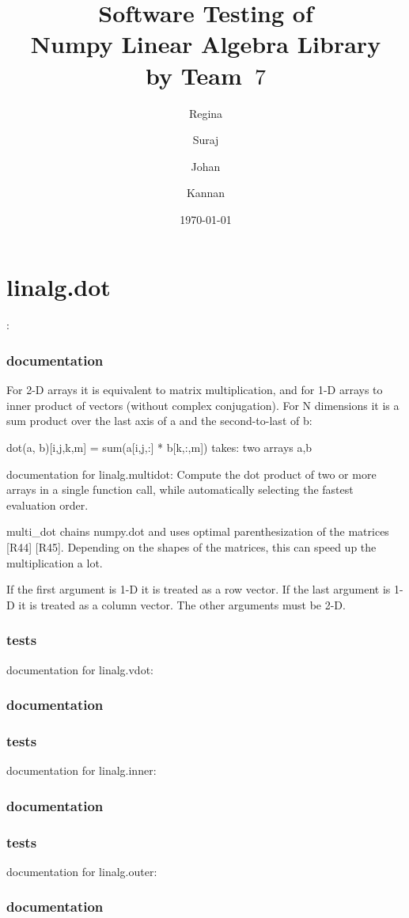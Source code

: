 \documentclass[a4paper,11pt]{article}
\title{\textbf{Software Testing of \\ Numpy Linear Algebra Library\\
        by Team~$7$                                   %
}
}
\author{Regina \and Suraj \and Johan \and Kannan}  %
\date{\today}
\begin{document}
\section{linalg.dot}:
\subsubsection{documentation}
For 2-D arrays it is equivalent to matrix multiplication, and for 1-D arrays to inner product of vectors (without complex conjugation). For N dimensions it is a sum product over the last axis of a and the second-to-last of b:

    dot(a, b)[i,j,k,m] = sum(a[i,j,:] * b[k,:,m])
    takes: two arrays a,b
    
documentation for linalg.multidot:
Compute the dot product of two or more arrays in a single function call, while automatically selecting the fastest evaluation order.

multi\_dot chains numpy.dot and uses optimal parenthesization of the matrices [R44] [R45]. Depending on the shapes of the matrices, this can speed up the multiplication a lot.

If the first argument is 1-D it is treated as a row vector. If the last argument is 1-D it is treated as a column vector. The other arguments must be 2-D.
\subsubsection{tests}

documentation for linalg.vdot:

\subsubsection{documentation}
\subsubsection{tests}

documentation for linalg.inner:

\subsubsection{documentation}
\subsubsection{tests}
documentation for linalg.outer:

\subsubsection{documentation}
\end{document}
